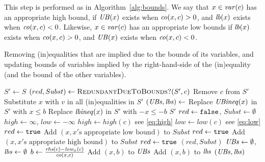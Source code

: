 This step is performed as in Algorithm~\ref{alg:bounds}. 
We say that $x\in\mathit{var}(c)$ has an appropriate high bound, if $\mathit{UB}(x)$ exists when $\mathit{co}(x,c)>0$, and $\mathit{lb}(x)$ exists when $\mathit{co}(x,c)<0$. Likewise, $x\in\mathit{var}(c)$ has an appropriate low bounds if $\mathit{lb}(x)$ exists when $\mathit{co}(x,c)>0$, and $\mathit{UB}(x)$ exists when $\mathit{co}(x,c)<0$.
\begin{algorithm}[htbp]
\caption{Removing (in)equalities that are implied due to the bounds of its variables, and updating bounds of variables implied by the right-hand-side of the (in)equality (and the bound of the other variables).}
\label{alg:bounds} 
\begin{algorithmic}[1]
\State $S'\gets S$
	\State $(red, Subst) \gets \Call{RedundantDueToBounds?}{S', c}$
		\State Remove $c$ from $S'$
			\State Substitute $x$ with $v$ in all (in)equalities in $S'$
		\EndFor
	\Else
		\State $(\mathit{UBs}, \mathit{lbs})\gets$
			\State Replace $\mathit{UBineq}(x)$ in $S'$ with $x\leq b$		
		\EndFor
			\State Replace $\mathit{lbineq}(x)$ in $S'$ with $-x\leq -b$
		\EndFor
	\EndIf
\EndFor
\State\Return $S'$
\EndFunction
\Statex
{}
	\State $red \gets  \texttt{false}$, $Subst \gets \emptyset$
	\State $high\gets \infty$, $low\gets -\infty$ 
		\State $high \gets \mathit{high}(c)$ \Comment see \eqref{eq:high}
	\EndIf
		\State $low\gets \mathit{low}(c)$ \Comment see \eqref{eq:low}
	\EndIf
		\State $red \gets \texttt{true}$
			\State Add $(x, x'\text{s appropriate low bound})$ to $Subst$
		\EndFor
		\State $red \gets \texttt{true}$
			\State Add $(x, x'\text{s appropriate high bound})$ to $Subst$
		\EndFor
		\State $red \gets \texttt{true}$
	\EndIf
	\State\Return $(red, Subst)$
\EndFunction
\Statex
{}
	\State $\mathit{UBs}\gets \emptyset$, $\mathit{lbs}\gets\emptyset$
			\State $b\gets \frac{\mathit{rhs}(c)-\mathit{low}_x(c)}{\mathit{co}(x,c)}$
				\State Add $(x, b)$ to $\mathit{UBs}$
				\State Add $(x,b)$ to $\mathit{lbs}$
			\EndIf
		\EndIf
	\EndFor
	\State\Return $(\mathit{UBs},\mathit{lbs})$
\EndFunction
\end{algorithmic}
\end{algorithm}

